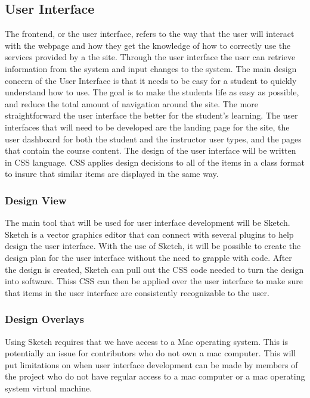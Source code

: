 \documentclass[onecolumn, draftclsnofoot,10pt, compsoc]{IEEEtran}
\begin{document}
\subsection{User Interface}
The frontend, or the user interface, refers to the way that the user will interact with the webpage and how they get the knowledge of how to correctly use the services provided by a the site. Through the user interface the user can retrieve information from the system and input changes to the system. The main design concern of the User Interface is that it needs to be easy for a student to quickly understand how to use. The goal is to make the students life as easy as possible, and reduce the total amount of navigation around the site.  The more straightforward the user interface the better for the student's learning. The user interfaces that will need to be developed are the landing page for the site, the user dashboard for both the student and the instructor user types, and the pages that contain the course content. The design of the user interface will be written in CSS language. CSS applies design decisions to all of the items in a class format to insure that similar items are displayed in the same way. 

\subsubsection{Design View}
The main tool that will be used for user interface development will be Sketch. Sketch is a vector graphics editor that can connect with several plugins to help design the user interface.\cite{sketch} With the use of Sketch, it will be possible to create the design plan for the user interface without the need to grapple with code. After the design is created, Sketch can pull out the CSS code needed to turn the design into software. Thiss CSS can then be applied over the user interface to make sure that items in the user interface are consistently recognizable  to the user.

\subsubsection{Design Overlays}
Using Sketch requires that we have access to a Mac operating system. This is potentially an issue for contributors who do not own a mac computer. This will put limitations on when user interface development can be made by members of the project who do not have regular access to a mac computer or a mac operating system virtual machine.
\end{document}
